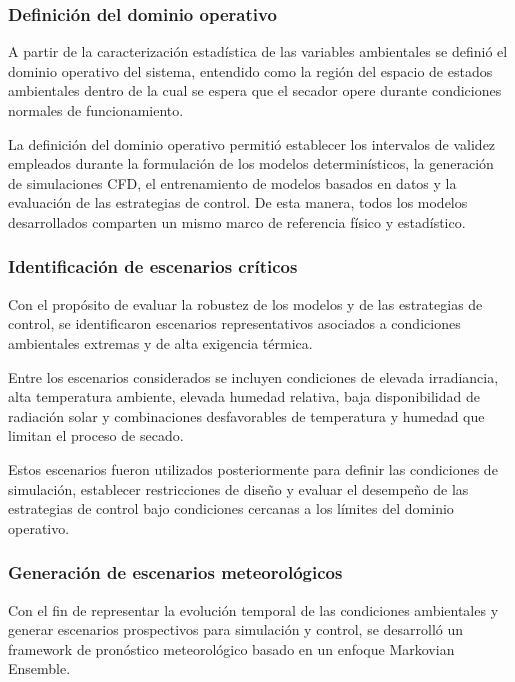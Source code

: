 \subsubsection{Definición del dominio operativo}

A partir de la caracterización estadística de las variables ambientales se definió el dominio operativo del sistema, entendido como la región del espacio de estados ambientales dentro de la cual se espera que el secador opere durante condiciones normales de funcionamiento.

La definición del dominio operativo permitió establecer los intervalos de validez empleados durante la formulación de los modelos determinísticos, la generación de simulaciones CFD, el entrenamiento de modelos basados en datos y la evaluación de las estrategias de control. De esta manera, todos los modelos desarrollados comparten un mismo marco de referencia físico y estadístico.

\subsubsection{Identificación de escenarios críticos}

Con el propósito de evaluar la robustez de los modelos y de las estrategias de control, se identificaron escenarios representativos asociados a condiciones ambientales extremas y de alta exigencia térmica.

Entre los escenarios considerados se incluyen condiciones de elevada irradiancia, alta temperatura ambiente, elevada humedad relativa, baja disponibilidad de radiación solar y combinaciones desfavorables de temperatura y humedad que limitan el proceso de secado.

Estos escenarios fueron utilizados posteriormente para definir las condiciones de simulación, establecer restricciones de diseño y evaluar el desempeño de las estrategias de control bajo condiciones cercanas a los límites del dominio operativo.

\subsubsection{Generación de escenarios meteorológicos}

Con el fin de representar la evolución temporal de las condiciones ambientales y generar escenarios prospectivos para simulación y control, se desarrolló un framework de pronóstico meteorológico basado en un enfoque Markovian Ensemble.

